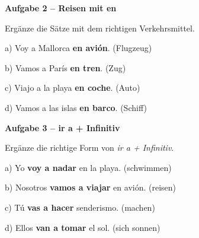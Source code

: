 \documentclass[11pt, a4paper]{article}
\newcommand{\fachfarbe}{spanisch}
\newcommand{\punktebox}[1]{\hfill\fbox{\small \_/#1}}
\newcommand{\lsg}[1]{\textcolor{loesung}{\textbf{#1}}}
\newenvironment{aufgabe}[1]{%
    \needspace{5\baselineskip}%
    \nopagebreak[4]%
    \vspace{10pt}
    \noindent\textbf{\textcolor{\fachfarbe}{Aufgabe #1}}
    \nopagebreak[4]%
    \vspace{5pt}
    \nopagebreak[4]%
    \begin{list}{}{\leftmargin=0pt}
    \item[]
}{%
    \end{list}
}
\newcommand{\es}[1]{\textcolor{\fachfarbe}{\textbf{#1}}}
\begin{document}
\vspace{15pt}


\begin{aufgabe}{2 -- Reisen mit \es{en}}
Ergänze die Sätze mit dem richtigen Verkehrsmittel. \punktebox{4}
\end{aufgabe}

\noindent
a) Voy a Mallorca \lsg{en avión}. \hfill (Flugzeug)

\vspace{0.8em}

\noindent
b) Vamos a París \lsg{en tren}. \hfill (Zug)

\vspace{0.8em}

\noindent
c) Viajo a la playa \lsg{en coche}. \hfill (Auto)

\vspace{0.8em}

\noindent
d) Vamos a las islas \lsg{en barco}. \hfill (Schiff)

\vspace{15pt}


\begin{aufgabe}{3 -- ir a + Infinitiv}
Ergänze die richtige Form von \textit{ir a + Infinitiv}. \punktebox{8}
\end{aufgabe}

\noindent
a) Yo \lsg{voy a nadar} en la playa. \hfill (schwimmen)

\vspace{0.8em}

\noindent
b) Nosotros \lsg{vamos a viajar} en avión. \hfill (reisen)

\vspace{0.8em}

\noindent
c) Tú \lsg{vas a hacer} senderismo. \hfill (machen)

\vspace{0.8em}

\noindent
d) Ellos \lsg{van a tomar} el sol. \hfill (sich sonnen)

\vspace{15pt}

\end{document}
